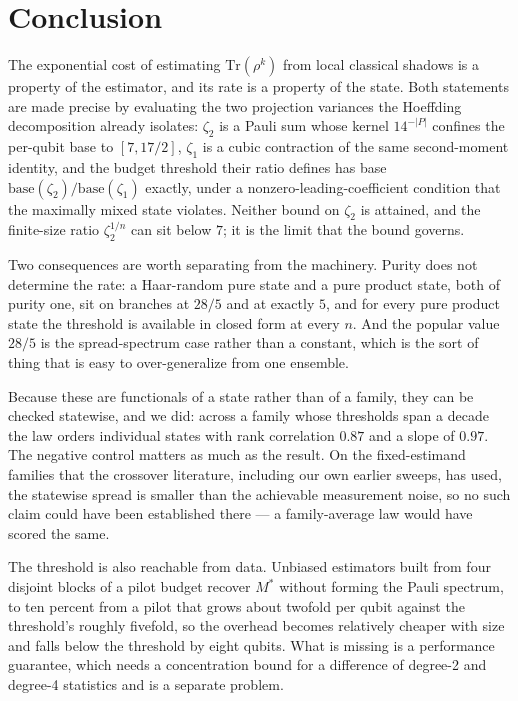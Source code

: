 \hypertarget{conclusion}{%
\section{Conclusion}\label{conclusion}}

The exponential cost of estimating \(\mathrm{Tr}(\rho^k)\) from local classical shadows is a
property of the estimator, and its rate is a property of the state. Both statements are made
precise by evaluating the two projection variances the Hoeffding decomposition already isolates:
\(\zeta_2\) is a Pauli sum whose kernel \(14^{-|P|}\) confines the per-qubit base to
\([7, 17/2]\), \(\zeta_1\) is a cubic contraction of the same second-moment identity, and the
budget threshold their ratio defines has base \(\mathrm{base}(\zeta_2)/\mathrm{base}(\zeta_1)\)
exactly, under a nonzero-leading-coefficient condition that the maximally mixed state violates.
Neither bound on \(\zeta_2\) is attained, and the finite-size ratio \(\zeta_2^{1/n}\) can sit
below \(7\); it is the limit that the bound governs.

Two consequences are worth separating from the machinery. Purity does not determine the rate: a
Haar-random pure state and a pure product state, both of purity one, sit on branches at \(28/5\)
and at exactly \(5\), and for every pure product state the threshold is available in closed form
at every \(n\). And the popular value \(28/5\) is the spread-spectrum case rather than a constant,
which is the sort of thing that is easy to over-generalize from one ensemble.

Because these are functionals of a state rather than of a family, they can be checked statewise,
and we did: across a family whose thresholds span a decade the law orders individual states with
rank correlation \(0.87\) and a slope of \(0.97\). The negative control matters as much as the
result. On the fixed-estimand families that the crossover literature, including our own earlier
sweeps, has used, the statewise spread is smaller than the achievable measurement noise, so no
such claim could have been established there --- a family-average law would have scored the same.

The threshold is also reachable from data. Unbiased estimators built from four disjoint blocks of
a pilot budget recover \(M^*\) without forming the Pauli spectrum, to ten percent from a pilot
that grows about twofold per qubit against the threshold's roughly fivefold, so the overhead
becomes relatively cheaper with size and falls below the threshold by eight qubits. What is
missing is a performance guarantee, which needs a concentration bound for a difference of degree-2
and degree-4 statistics and is a separate problem.

